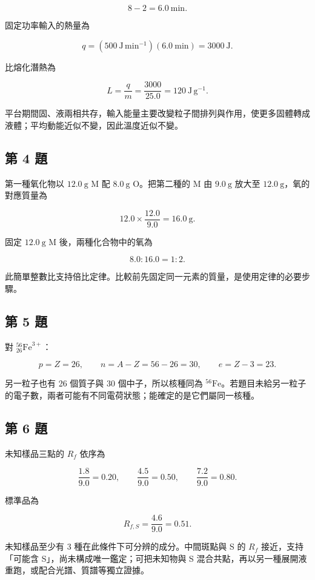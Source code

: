 \documentclass[11pt,a4paper]{article}
\begin{document}
\[
8-2=6.0\ \mathrm{min}.
\]

固定功率輸入的熱量為

\[
q=(500\ \mathrm{J\,min^{-1}})(6.0\ \mathrm{min})
=3000\ \mathrm J.
\]

比熔化潛熱為

\[
L=\frac qm=\frac{3000}{25.0}
=\boxed{120\ \mathrm{J\,g^{-1}}}.
\]

平台期間固、液兩相共存，輸入能量主要改變粒子間排列與作用，使更多固體轉成液體；平均動能近似不變，因此溫度近似不變。

\subsection{第 4 題}\label{ux7b2c-4-ux984c}

第一種氧化物以 \(12.0\ \mathrm g\) M 配 \(8.0\ \mathrm g\) O。把第二種的 M 由 \(9.0\ \mathrm g\) 放大至 \(12.0\ \mathrm g\)，氧的對應質量為

\[
12.0\times\frac{12.0}{9.0}=16.0\ \mathrm g.
\]

固定 \(12.0\ \mathrm g\) M 後，兩種化合物中的氧為

\[
8.0:16.0=\boxed{1:2}.
\]

此簡單整數比支持倍比定律。比較前先固定同一元素的質量，是使用定律的必要步驟。

\subsection{第 5 題}\label{ux7b2c-5-ux984c}

對 \({}^{56}_{26}\mathrm{Fe}^{3+}\)：

\[
p=Z=26,
\qquad n=A-Z=56-26=30,
\qquad e=Z-3=23.
\]

另一粒子也有 26 個質子與 30 個中子，所以核種同為 \(^{56}\mathrm{Fe}\)。若題目未給另一粒子的電子數，兩者可能有不同電荷狀態；能確定的是它們屬同一核種。

\subsection{第 6 題}\label{ux7b2c-6-ux984c}

未知樣品三點的 \(R_f\) 依序為

\[
\frac{1.8}{9.0}=0.20,
\qquad
\frac{4.5}{9.0}=0.50,
\qquad
\frac{7.2}{9.0}=0.80.
\]

標準品為

\[
R_{f,S}=\frac{4.6}{9.0}=0.51.
\]

未知樣品至少有 3 種在此條件下可分辨的成分。中間斑點與 S 的 \(R_f\) 接近，支持「可能含 S」，尚未構成唯一鑑定；可把未知物與 S 混合共點，再以另一種展開液重跑，或配合光譜、質譜等獨立證據。
\end{document}
